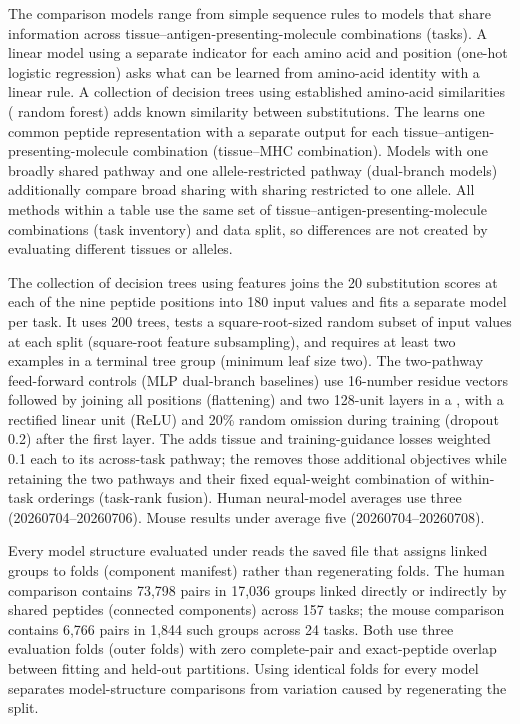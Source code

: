 The comparison models range from simple sequence rules to models that share information across tissue--antigen-presenting-molecule combinations (tasks). A linear model using a separate indicator for each amino acid and position (one-hot logistic regression) asks what can be learned from amino-acid identity with a linear rule. A collection of decision trees using established amino-acid similarities (\plainBLOSUM{} random forest) adds known similarity between substitutions. The \plainSharedHeads{} learns one common peptide representation with a separate output for each tissue--antigen-presenting-molecule combination (tissue--MHC combination). Models with one broadly shared pathway and one allele-restricted pathway (dual-branch models) additionally compare broad sharing with sharing restricted to one \plainHLA{} allele. All methods within a table use the same set of tissue--antigen-presenting-molecule combinations (task inventory) and data split, so differences are not created by evaluating different tissues or alleles.

The collection of decision trees using \plainBLOSUM{} features \cite{henikoff1992blosum} joins the 20 substitution scores at each of the nine peptide positions into 180 input values and fits a separate model per task. It uses 200 trees, tests a square-root-sized random subset of input values at each split (square-root feature subsampling), and requires at least two examples in a terminal tree group (minimum leaf size two). The two-pathway feed-forward controls (MLP dual-branch baselines) use 16-number residue vectors followed by joining all positions (flattening) and two 128-unit layers in a \plainMLP{}, with a rectified linear unit (ReLU) and 20\% random omission during training (dropout 0.2) after the first layer. The \plainAuxDual{} adds tissue and \plainHLA{} training-guidance losses weighted 0.1 each to its across-task pathway; the \plainPlainDual{} removes those additional objectives while retaining the two pathways and their fixed equal-weight combination of within-task orderings (task-rank fusion). Human neural-model averages use three \plainSeeds{} (20260704--20260706). Mouse results under \plainPeptideOOF{} average five \plainSeeds{} (20260704--20260708).

Every model structure evaluated under \plainPeptideOOF{} reads the saved file that assigns linked groups to folds (component manifest) rather than regenerating folds. The human comparison contains 73,798 pairs in 17,036 groups linked directly or indirectly by shared peptides (connected components) across 157 tasks; the mouse comparison contains 6,766 pairs in 1,844 such groups across 24 tasks. Both use three evaluation folds (outer folds) with zero complete-pair and exact-peptide overlap between fitting and held-out partitions. Using identical folds for every model separates model-structure comparisons from variation caused by regenerating the split.

